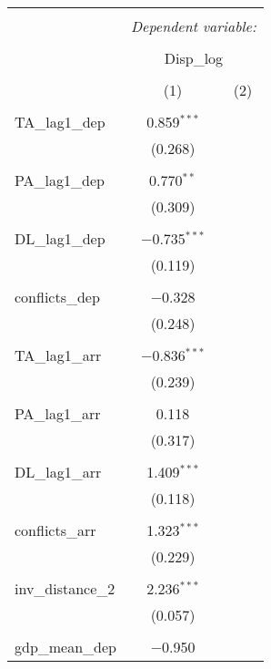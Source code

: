 
\begin{table}[!htbp] \centering 
  \caption{} 
  \label{} 
\begin{tabular}{@{\extracolsep{5pt}}lcc} 
\\[-1.8ex]\hline 
\hline \\[-1.8ex] 
 & \multicolumn{2}{c}{\textit{Dependent variable:}} \\ 
\cline{2-3} 
\\[-1.8ex] & \multicolumn{2}{c}{Disp\_log} \\ 
\\[-1.8ex] & (1) & (2)\\ 
\hline \\[-1.8ex] 
 TA\_lag1\_dep & 0.859$^{***}$ &  \\ 
  & (0.268) &  \\ 
  & & \\ 
 PA\_lag1\_dep & 0.770$^{**}$ &  \\ 
  & (0.309) &  \\ 
  & & \\ 
 DL\_lag1\_dep & $-$0.735$^{***}$ &  \\ 
  & (0.119) &  \\ 
  & & \\ 
 conflicts\_dep & $-$0.328 &  \\ 
  & (0.248) &  \\ 
  & & \\ 
 TA\_lag1\_arr & $-$0.836$^{***}$ &  \\ 
  & (0.239) &  \\ 
  & & \\ 
 PA\_lag1\_arr & 0.118 &  \\ 
  & (0.317) &  \\ 
  & & \\ 
 DL\_lag1\_arr & 1.409$^{***}$ &  \\ 
  & (0.118) &  \\ 
  & & \\ 
 conflicts\_arr & 1.323$^{***}$ &  \\ 
  & (0.229) &  \\ 
  & & \\ 
 inv\_distance\_2 & 2.236$^{***}$ &  \\ 
  & (0.057) &  \\ 
  & & \\ 
 gdp\_mean\_dep & $-$0.950 &  \\ 

\end{tabular}
\end{table}
